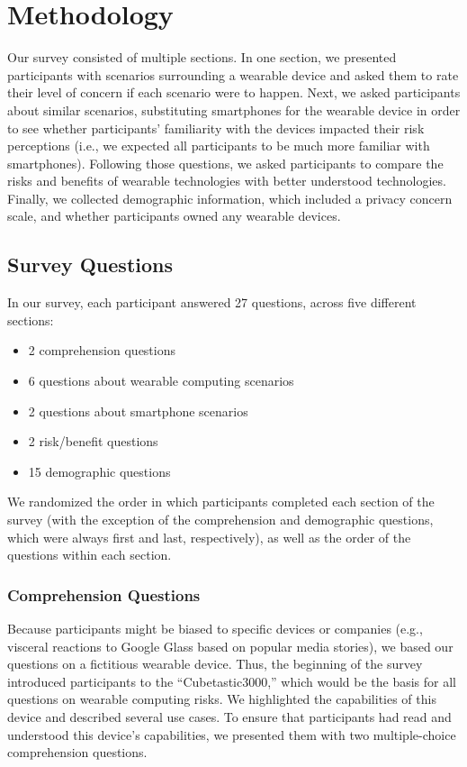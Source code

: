 \documentclass{acm_proc_article-sp}
\begin{document}

\section{Methodology}
Our survey consisted of multiple sections. In one section, we presented participants with scenarios surrounding a wearable device and asked them to rate their level of concern if each scenario were to happen. Next, we asked participants about similar scenarios, substituting smartphones for the wearable device in order to see whether participants' familiarity with the devices impacted their risk perceptions (i.e., we expected all participants to be much more familiar with smartphones). Following those questions, we asked participants to compare the risks and benefits of wearable technologies with better understood technologies. Finally, we collected demographic information, which included a privacy concern scale, and whether participants owned any wearable devices. 


\subsection{Survey Questions}
In our survey, each participant answered 27 questions, across five different sections:   \\[-.8cm]

\begin{itemize} \itemsep1pt \parskip0pt 
\item 2 comprehension questions
\item 6 questions about wearable computing scenarios 
\item 2 questions about smartphone scenarios 
\item 2 risk/benefit questions 
\item 15 demographic questions \\[-.8cm]
\end{itemize}

We randomized the order in which participants completed each section of the survey (with the exception of the comprehension and demographic questions, which were always first and last, respectively), as well as the order of the questions within each section.

\subsubsection{Comprehension Questions}
Because participants might be biased to specific devices or companies (e.g., visceral reactions to Google Glass based on popular media stories), we based our questions on a fictitious wearable device. Thus, the beginning of the survey introduced participants to the ``Cubetastic3000,'' which would be the basis for all questions on wearable computing risks. We highlighted the capabilities of this device and described several use cases. To ensure that participants had read and understood this device's capabilities, we presented them with two multiple-choice comprehension questions.
\end{document}
